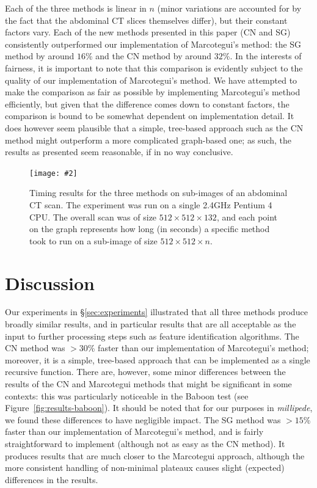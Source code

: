 \documentclass[review,a4paper]{elsarticle}
\newcommand{\stufigex}[5]					%
{
	\begin{figure}[#5]
	\begin{center}
		\texttt{[image: \#2]}
		\caption{#3}
		\label{#4}
	\end{center}
	\end{figure}
}
\begin{document}
Each of the three methods is linear in $n$ (minor variations are accounted for by the fact that the abdominal CT slices themselves differ), but their constant factors vary. Each of the new methods presented in this paper (CN and SG) consistently outperformed our implementation of Marcotegui's method: the SG method by around $16$\% and the CN method by around $32$\%. In the interests of fairness, it is important to note that this comparison is evidently subject to the quality of our implementation of Marcotegui's method. We have attempted to make the comparison as fair as possible by implementing Marcotegui's method efficiently, but given that the difference comes down to constant factors, the comparison is bound to be somewhat dependent on implementation detail. It does however seem plausible that a simple, tree-based approach such as the CN method might outperform a more complicated graph-based one; as such, the results as presented seem reasonable, if in no way conclusive.

\stufigex{width=.95\linewidth}{timings.png}{Timing results for the three methods on sub-images of an abdominal CT scan. The experiment was run on a single 2.4GHz Pentium 4 CPU. The overall scan was of size $512 \times 512 \times 132$, and each point on the graph represents how long (in seconds) a specific method took to run on a sub-image of size $512 \times 512 \times n$.}{fig:timings}{!t}


\section{Discussion}
\label{sec:discussion}

Our experiments in \S\ref{sec:experiments} illustrated that all three methods produce broadly similar results, and in particular results that are all acceptable as the input to further processing steps such as feature identification algorithms. The CN method was $> 30$\% faster than our implementation of Marcotegui's method; moreover, it is a simple, tree-based approach that can be implemented as a single recursive function. There are, however, some minor differences between the results of the CN and Marcotegui methods that might be significant in some contexts: this was particularly noticeable in the Baboon test (see Figure~\ref{fig:results-baboon}). It should be noted that for our purposes in \emph{millipede}, we found these differences to have negligible impact. The SG method was $> 15$\% faster than our implementation of Marcotegui's method, and is fairly straightforward to implement (although not as easy as the CN method). It produces results that are much closer to the Marcotegui approach, although the more consistent handling of non-minimal plateaux causes slight (expected) differences in the results.
\end{document}
